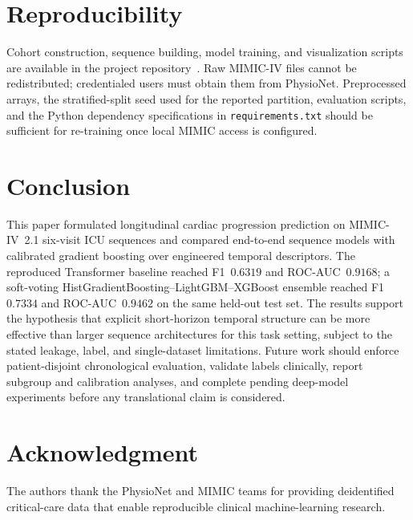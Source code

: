\documentclass[conference]{IEEEtran}
\begin{document}
\section{Reproducibility}
Cohort construction, sequence building, model training, and visualization scripts are available in the project repository~\cite{projectrepository}. Raw MIMIC-IV files cannot be redistributed; credentialed users must obtain them from PhysioNet. Preprocessed arrays, the stratified-split seed used for the reported partition, evaluation scripts, and the Python dependency specifications in \texttt{requirements.txt} should be sufficient for re-training once local MIMIC access is configured.

\section{Conclusion}
This paper formulated longitudinal cardiac progression prediction on MIMIC-IV~2.1 six-visit ICU sequences and compared end-to-end sequence models with calibrated gradient boosting over engineered temporal descriptors. The reproduced Transformer baseline reached F1~$0.6319$ and ROC-AUC~$0.9168$; a soft-voting HistGradientBoosting--LightGBM--XGBoost ensemble reached F1~$0.7334$ and ROC-AUC~$0.9462$ on the same held-out test set. The results support the hypothesis that explicit short-horizon temporal structure can be more effective than larger sequence architectures for this task setting, subject to the stated leakage, label, and single-dataset limitations. Future work should enforce patient-disjoint chronological evaluation, validate labels clinically, report subgroup and calibration analyses, and complete pending deep-model experiments before any translational claim is considered.

\section*{Acknowledgment}
The authors thank the PhysioNet and MIMIC teams for providing deidentified critical-care data that enable reproducible clinical machine-learning research.



\end{document}
